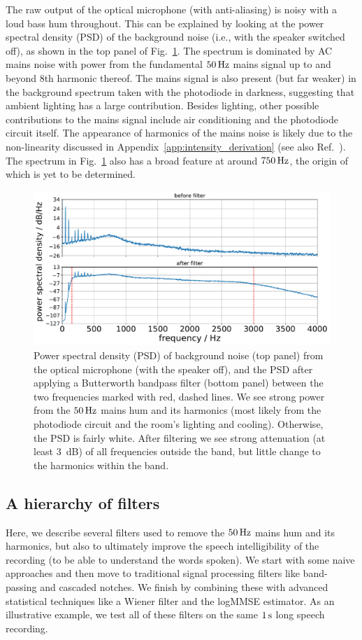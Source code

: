 \documentclass[paper-main.tex]{subfiles}
\begin{document}
The raw output of the optical microphone (with anti-aliasing) is noisy with a loud bass hum throughout. This can be explained by looking at the power spectral density (PSD) of the background noise (i.e., with the speaker switched off), as shown in the top panel of Fig.~\ref{fig:psd_noise}. The spectrum is dominated by AC mains noise with power from the fundamental $50\,{\rm Hz}$ mains signal up to and beyond $8$th harmonic thereof. The mains signal is also present (but far weaker) in the background spectrum taken with the photodiode in darkness, suggesting that ambient lighting has a large contribution. Besides lighting, other possible contributions to the mains signal include air conditioning and the photodiode circuit itself. The appearance of harmonics of the mains noise is likely due to the non-linearity discussed in Appendix~\ref{app:intensity_derivation} (see also Ref.~\cite{feynman}). The spectrum in Fig.~\ref{fig:psd_noise} also has a broad feature at around $750\,{\rm Hz}$, the origin of which is yet to be determined.


\begin{figure}
	\includegraphics[width=.49\textwidth]{figures/psd_butterworth_14_6.pdf}
	\caption{\label{fig:psd_noise}
Power spectral density (PSD) of background noise (top panel) from the optical microphone (with the speaker off), and the PSD after applying a Butterworth bandpass filter (bottom panel) between the two frequencies marked with red, dashed lines. 
We see strong power from the $50\,{\rm Hz}$ mains hum and its harmonics (most likely from the photodiode circuit and the room’s lighting and cooling). Otherwise, the PSD is fairly white. 
After filtering we see strong attenuation (at least 3~dB) of all frequencies outside the band, but little change to the harmonics within the band.
}
\end{figure}


\subsection{A hierarchy of filters}
\label{sec:filters}

Here, we describe several filters used to remove the $50\,{\rm Hz}$ mains hum and its harmonics, but also to ultimately improve the speech intelligibility of the recording (to be able to understand the words spoken). We start with some naive approaches and then move to traditional signal processing filters like band-passing and cascaded notches. We finish by combining these with advanced statistical techniques like a Wiener filter and the logMMSE estimator. As an illustrative example, we test all of these filters on the same $1\,{\rm s}$ long speech recording.
\end{document}
